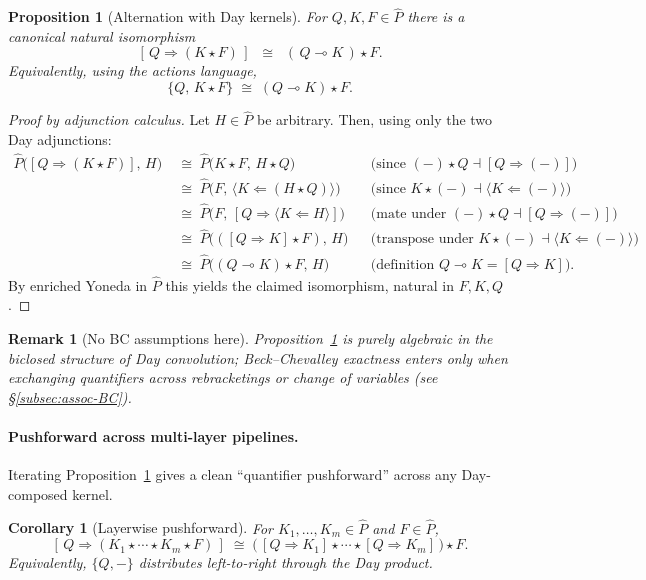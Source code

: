 \documentclass[11pt]{article}
\numberwithin{equation}{section}
\theoremstyle{upright}
\newtheorem{corollary}{Corollary}
\newtheorem{proposition}{Proposition}
\newtheorem{remark}{Remark}
\newcommand{\BC}{Beck--Chevalley}
\begin{document}
\begin{proposition}[Alternation with Day kernels]\label{prop:day-alternation}
For $Q,K,F\in\widehat P$ there is a canonical natural isomorphism
\[
[\,Q\Rightarrow (K\star F)\,]\;\;\cong\;\; (\,Q\multimap K\,)\star F.
\]
Equivalently, using the actions language,
\[
\{Q,\,K\star F\}\;\cong\;(Q\multimap K)\star F.
\]
\end{proposition}

\begin{proof}[Proof by adjunction calculus]
Let $H\in\widehat P$ be arbitrary. Then, using only the two Day adjunctions:
\begin{align*}
\widehat P\big([Q\Rightarrow (K\star F)],\,H\big)
&\;\cong\; \widehat P\big(K\star F,\,H\star Q\big)
&& \text{(since $(-)\star Q \dashv [Q\Rightarrow(-)]$)}\\
&\;\cong\; \widehat P\big(F,\,\langle K\Leftarrow(H\star Q)\rangle\big)
&& \text{(since $K\star(-) \dashv \langle K\Leftarrow(-)\rangle$)}\\
&\;\cong\; \widehat P\big(F,\, [Q\Rightarrow\langle K\Leftarrow H\rangle]\big)
&& \text{(mate under $(-)\star Q \dashv [Q\Rightarrow(-)]$)}\\
&\;\cong\; \widehat P\big(([Q\Rightarrow K]\star F),\,H\big)
&& \text{(transpose under $K\star(-) \dashv \langle K\Leftarrow(-)\rangle$)}\\
&\;\cong\; \widehat P\big((Q\multimap K)\star F,\,H\big)
&& \text{(definition $Q\multimap K=[Q\Rightarrow K]$).}
\end{align*}
By enriched Yoneda in $\widehat P$ this yields the claimed isomorphism, natural in $F,K,Q$.
\end{proof}

\begin{remark}[No BC assumptions here]
Proposition~\ref{prop:day-alternation} is purely algebraic in the biclosed
structure of Day convolution; \BC{} exactness enters only when exchanging
quantifiers across \emph{rebracketings} or change of variables (see \S\ref{subsec:assoc-BC}).
\end{remark}

\paragraph{Pushforward across multi-layer pipelines.}
Iterating Proposition~\ref{prop:day-alternation} gives a clean ``quantifier
pushforward'' across any Day-composed kernel.

\begin{corollary}[Layerwise pushforward]\label{cor:layerwise-push}
For $K_1,\dots,K_m\in\widehat P$ and $F\in\widehat P$,
\[
[\,Q\Rightarrow (K_1\star\cdots\star K_m\star F)\,]
\;\cong\;
\bigl(\,[Q\Rightarrow K_1]\star\cdots\star [Q\Rightarrow K_m]\,\bigr)\star F.
\]
Equivalently, $\{Q,-\}$ distributes left-to-right through the Day product.
\end{corollary}
\end{document}
